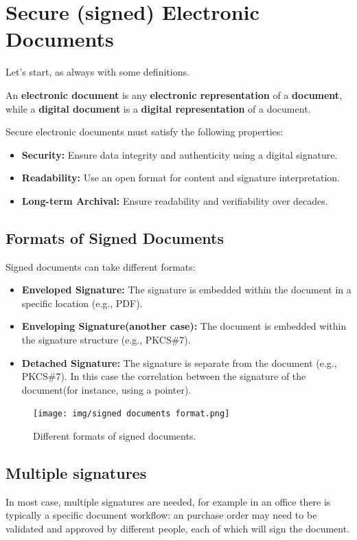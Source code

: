 \chapter{Secure (signed) Electronic Documents}

Let's start, as always with some definitions.
\begin{boxH}
  An \textbf{electronic document} is any \textbf{electronic
  representation} of a \textbf{document}, while a \textbf{digital
  document} is a \textbf{digital representation} of a document.
\end{boxH}

Secure electronic documents must satisfy the following properties:
\begin{itemize}
    \item \textbf{Security:} Ensure data integrity and authenticity
      using a digital signature.
    \item \textbf{Readability:} Use an open format for content and
      signature interpretation.
    \item \textbf{Long-term Archival:} Ensure readability and
      verifiability over decades.
\end{itemize}

\section{Formats of Signed Documents}
Signed documents can take different formats:
\begin{itemize}
    \item \textbf{Enveloped Signature:} The signature is embedded
      within the document in a specific location (e.g., PDF).
    \item \textbf{Enveloping Signature(another case):} The document is
      embedded within the signature structure (e.g., PKCS\#7).
    \item \textbf{Detached Signature:} The signature is separate from
      the document (e.g., PKCS\#7). In this case the correlation
      between the signature of the document(for instance, using a
      pointer).
\end{itemize}

\begin{figure}[H]
  \centering
  \texttt{[image: img/signed documents
  format.png]}
  \caption{Different formats of signed documents.}
\end{figure}

\section{Multiple signatures}
In most case, multiple signatures are needed, for example in an office
there is typically a specific document workflow: an purchase order 
may need to be validated and approved by different people, each of 
which will sign the document.

